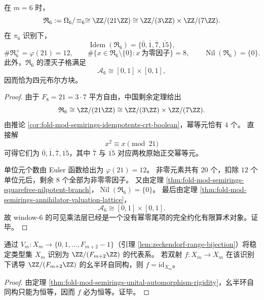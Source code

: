 \begin{proposition}\label{prop:fold-mod-semirings-window6-semisimple-skeleton}
在 \(m=6\) 时，
\[
\mathfrak R_6:=\Omega_6/\!\equiv_6
\cong
\ZZ/(21\ZZ)
\cong
\ZZ/(3\ZZ)\times \ZZ/(7\ZZ).
\]
在 \(\pi_6\) 识别下，
\[
\operatorname{Idem}(\mathfrak R_6)=\{\overline 0,\overline 1,\overline 7,\overline{15}\},
\]
\[
\#\mathfrak R_6^\times=\varphi(21)=12,
\qquad
\#\{x\in \mathfrak R_6\setminus\{0\}:x\ \text{为零因子}\}=8,
\qquad
\operatorname{Nil}(\mathfrak R_6)=\{0\}.
\]
此外，\(\mathfrak R_6\) 的湮灭子格满足
\[
\mathcal A_6\cong [0,1]\times[0,1],
\]
因而恰为四元布尔方块。
\end{proposition}
\begin{proof}
由于 \(F_8=21=3\cdot 7\) 平方自由，中国剩余定理给出
\[
\mathfrak R_6\cong \ZZ/(21\ZZ)\cong \ZZ/(3\ZZ)\times \ZZ/(7\ZZ).
\]
由推论 \ref{cor:fold-mod-semirings-idempotents-crt-boolean}，幂等元恰有 \(4\) 个。
直接解
\[
x^2\equiv x\pmod{21}
\]
可得它们为 \(\overline 0,\overline 1,\overline 7,\overline{15}\)，其中 \(\overline 7\) 与 \(\overline{15}\) 对应两枚原始正交幂等元。

单位元个数由 Euler 函数给出为 \(\varphi(21)=12\)。
非零元素共有 \(20\) 个，扣除 \(12\) 个单位元后，剩余 \(8\) 个全部为非零零因子。
又由定理 \ref{thm:fold-mod-semirings-squarefree-nilpotent-branch}，\(\operatorname{Nil}(\mathfrak R_6)=\{0\}\)。
最后由定理 \ref{thm:fold-mod-semirings-annihilator-valuation-lattice}，
\[
\mathcal A_6\cong [0,1]\times[0,1].
\]
故 window-\(6\) 的可见乘法层已经是一个没有幂零尾项的完全约化有限算术对象。证毕。
\end{proof}

\begin{corollary}[稳定类型上的幺半环对称不可见性]\label{cor:fold-visible-unital-semirings-no-nontrivial-symmetry}
通过 \(V_m:X_m\to\{0,1,\dots,F_{m+2}-1\}\)（引理 \ref{lem:zeckendorf-range-bijection}）将稳定类型集 \(X_m\) 识别为 \(\ZZ/(F_{m+2}\ZZ)\) 的代表系。
若双射 \(f:X_m\to X_m\) 在该识别下诱导 \(\ZZ/(F_{m+2}\ZZ)\) 的幺半环自同构，则 \(f=\mathrm{id}_{X_m}\)。
\end{corollary}
\begin{proof}
由定理 \ref{thm:fold-mod-semirings-unital-automorphism-rigidity}，幺半环自同构只能为恒等，因而 \(f\) 必为恒等。证毕。
\end{proof}

